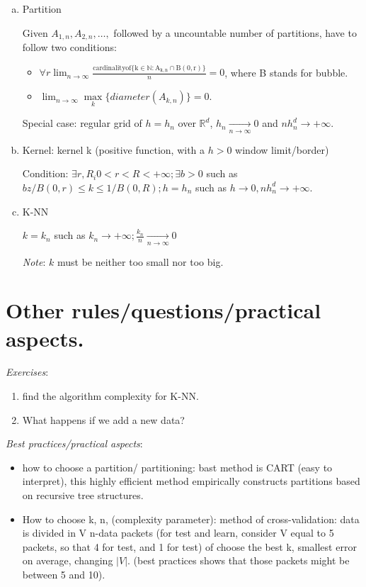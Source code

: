 			\begin{enumerate}[(a)]
				\item Partition
					
						Given $A_{1,n}, A_{2,n}, \dots, $ followed by a uncountable number of partitions, have to follow two conditions:
						
						\begin{itemize}
							\item $\forall r \lim_{n \to \infty} \frac{\operatorname{cardinality of \{k \in \mathbb{N}: A_{k,n} \cap B(0,r)\}}}{n} = 0$, where B stands for bubble.
							\item $\lim_{n \to \infty} \underset{k}{\operatorname{max}} \{diameter(A_{k,n})\} = 0$.
						\end{itemize}

						Special case: regular grid of $h=h_n$ over $\mathbb{R}^d$, $h_n \xrightarrow[n\to \infty]{} 0 $ and $nh_n^d \to +\infty$.

				\item Kernel: kernel k (positive function, with a $h>0$ window limit/border)

					Condition: $\exists r, R_i 0<r<R<+\infty; \exists b > 0 $ such as $b z/B(0,r) \leq k \leq 1/B(0,R); h=h_n$ such as $h\to 0, nh_n^d \to +\infty$.

				\item K-NN
					
					$k=k_n$ such as $k_n \to +\infty; \frac{k_n}{n} \xrightarrow[n\to \infty]{} 0$

					\emph{Note}: $k$ must be neither too small nor too big.
			\end{enumerate}

			

	\section{Other rules/questions/practical aspects.}
		
			\emph{Exercises}:

			\begin{enumerate}[1.]
				\item find the algorithm complexity for K-NN.
				\item What happens if we add a new data?
			\end{enumerate}

			\emph{Best practices/practical aspects}:

			\begin{itemize}
				\item how to choose a partition/ partitioning: bast method is CART (easy to interpret), this highly efficient method empirically constructs partitions based on recursive tree structures.
				\item How to choose k, n, (complexity parameter): method of cross-validation: data is divided in V n-data packets (for test and learn, consider V equal to 5 packets, so that 4 for test, and 1 for test) of choose the best k, smallest error on average, changing $|V|$. (best practices shows that those packets might be between 5 and 10).
			\end{itemize}

